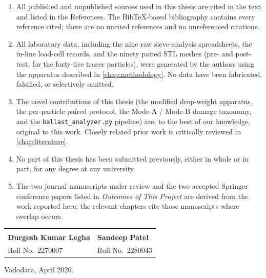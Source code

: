 \begin{enumerate}[leftmargin=*,itemsep=4pt]
    \item All published and unpublished sources used in this thesis are
          cited in the text and listed in the References. The
          BibTeX-based bibliography contains every reference cited;
          there are no uncited references and no unreferenced
          citations.
    \item All laboratory data, including the nine raw sieve-analysis
          spreadsheets, the in-line load-cell records, and the
          ninety paired \gls{STL} meshes (pre- and post-test, for the
          forty-five tracer particles), were generated by the authors
          using the apparatus described in \cref{chap:methodology}.
          No data have been fabricated, falsified, or selectively
          omitted.
    \item The novel contributions of this thesis (the modified
          drop-weight apparatus, the per-particle paired protocol, the
          Mode-A / Mode-B damage taxonomy, and the
          \texttt{ballast\_analyzer.py} pipeline) are, to the best of
          our knowledge, original to this work. Closely related prior
          work is critically reviewed in \cref{chap:literature}.
    \item No part of this thesis has been submitted previously, either
          in whole or in part, for any degree at any university.
    \item The two journal manuscripts under review and the two
          accepted Springer conference papers listed in
          \emph{Outcomes of This Project} are derived from the work
          reported here; the relevant chapters cite those manuscripts
          where overlap occurs.
\end{enumerate}

\vspace{1.5cm}
\noindent
\begin{tabular}{p{}p{}}
\rule{0pt}{40pt}\hrulefill & \rule{0pt}{40pt}\hrulefill \\
\textbf{Durgesh Kumar Legha} & \textbf{Sandeep Patel} \\
Roll No.\ 2270007            & Roll No.\ 2280043 \\
\end{tabular}

\vspace{1.0cm}
\noindent Vadodara, April 2026.

\endgroup

